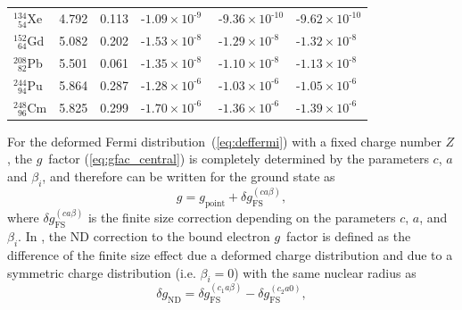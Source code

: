 \begin{table}[b]
\begin{tabular}{l|ccccc}
$^{134}_{\phantom{0}54}$Xe           & 4.792 & 0.113 & ${\text{-}}{1.09}{\scriptstyle\times}{10^{\text{-}9\phantom{0}}}$ &${\text{-}}{9.36}{\scriptstyle\times}{10^{\text{-}10}}$&${\text{-}}{9.62}{\scriptstyle\times}{10^{\text{-}10}}$\\[4pt]
$^{152}_{\phantom{0}64}$Gd           & 5.082 & 0.202 & ${\text{-}}{1.53}{\scriptstyle\times}{10^{\text{-}8\phantom{0}}}$ &${\text{-}}{1.29}{\scriptstyle\times}{10^{\text{-}8\phantom{0}}}$&${\text{-}}{1.32}{\scriptstyle\times}{10^{\text{-}8\phantom{0}}}$\\[4pt]
$^{208}_{\phantom{0}82}$Pb           & 5.501 & 0.061 & ${\text{-}}{1.35}{\scriptstyle\times}{10^{\text{-}8\phantom{0}}}$ &${\text{-}}{1.10}{\scriptstyle\times}{10^{\text{-}8\phantom{0}}}$&${\text{-}}{1.13}{\scriptstyle\times}{10^{\text{-}8\phantom{0}}}$\\[4pt]
$^{244}_{\phantom{0}94}$Pu           & 5.864 & 0.287 & ${\text{-}}{1.28}{\scriptstyle\times}{10^{\text{-}6\phantom{0}}}$ &${\text{-}}{1.03}{\scriptstyle\times}{10^{\text{-}6\phantom{0}}}$&${\text{-}}{1.05}{\scriptstyle\times}{10^{\text{-}6\phantom{0}}}$\\[4pt]
$^{248}_{\phantom{0}96}$Cm           & 5.825 & 0.299 & ${\text{-}}{1.70}{\scriptstyle\times}{10^{\text{-}6\phantom{0}}}$ &${\text{-}}{1.36}{\scriptstyle\times}{10^{\text{-}6\phantom{0}}}$&${\text{-}}{1.39}{\scriptstyle\times}{10^{\text{-}6\phantom{0}}}$\\[4pt]
\end{tabular}
\end{table}
%
For the deformed Fermi distribution~(\ref{eq:deffermi}) with a fixed charge number $Z$, the $g$~factor (\ref{eq:gfac_central}) is completely determined by the parameters $c$, $a$ and $\beta_i$, and therefore can be written for the ground state as
\begin{equation}
g = g_{\text{point}} + \delta g^{(ca\beta)}_{\text{FS}},
\label{eq:finiteDef}
\end{equation}
where $\delta g^{(ca\beta)}_{\text{FS}}$ is the finite size correction depending on the parameters $c$, $a$, and $\beta_i$. In \cite{jacek2012}, the ND correction to the bound electron $g$~factor is defined as the difference of the finite size effect due a deformed charge distribution and due to a symmetric charge distribution (i.e. ${\beta_i}{=}{0}$) with the same nuclear radius as
\begin{equation}
\delta g_{\text{ND}}=\delta g^{(c_1a\beta)}_{\text{FS}} - \delta g^{(c_2a0)}_{\text{FS}},
\label{eq:defdgnd}
\end{equation}

